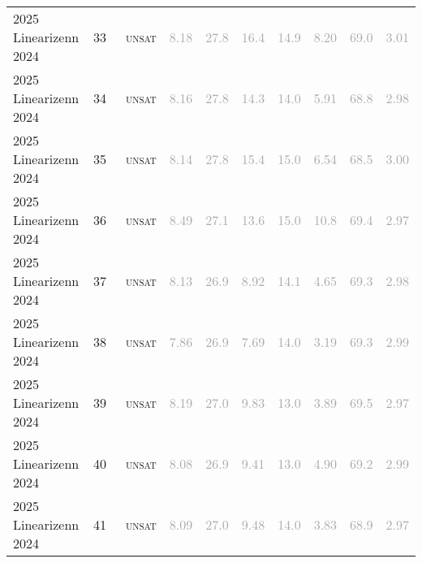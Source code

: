 \begin{center}
{\begin{longtable}{@{}llllllllll@{}}
2025 Linearizenn 2024 & 33 & ~\textsc{unsat} & \textcolor{darkgray}{8.18} & \textcolor{darkgray}{27.8} & \textcolor{darkgray}{16.4} & \textcolor{darkgray}{14.9} & \textcolor{darkgray}{8.20} & \textcolor{darkgray}{69.0} & \textcolor{darkgray}{3.01} \\
2025 Linearizenn 2024 & 34 & ~\textsc{unsat} & \textcolor{darkgray}{8.16} & \textcolor{darkgray}{27.8} & \textcolor{darkgray}{14.3} & \textcolor{darkgray}{14.0} & \textcolor{darkgray}{5.91} & \textcolor{darkgray}{68.8} & \textcolor{darkgray}{2.98} \\
2025 Linearizenn 2024 & 35 & ~\textsc{unsat} & \textcolor{darkgray}{8.14} & \textcolor{darkgray}{27.8} & \textcolor{darkgray}{15.4} & \textcolor{darkgray}{15.0} & \textcolor{darkgray}{6.54} & \textcolor{darkgray}{68.5} & \textcolor{darkgray}{3.00} \\
2025 Linearizenn 2024 & 36 & ~\textsc{unsat} & \textcolor{darkgray}{8.49} & \textcolor{darkgray}{27.1} & \textcolor{darkgray}{13.6} & \textcolor{darkgray}{15.0} & \textcolor{darkgray}{10.8} & \textcolor{darkgray}{69.4} & \textcolor{darkgray}{2.97} \\
2025 Linearizenn 2024 & 37 & ~\textsc{unsat} & \textcolor{darkgray}{8.13} & \textcolor{darkgray}{26.9} & \textcolor{darkgray}{8.92} & \textcolor{darkgray}{14.1} & \textcolor{darkgray}{4.65} & \textcolor{darkgray}{69.3} & \textcolor{darkgray}{2.98} \\
2025 Linearizenn 2024 & 38 & ~\textsc{unsat} & \textcolor{darkgray}{7.86} & \textcolor{darkgray}{26.9} & \textcolor{darkgray}{7.69} & \textcolor{darkgray}{14.0} & \textcolor{darkgray}{3.19} & \textcolor{darkgray}{69.3} & \textcolor{darkgray}{2.99} \\
2025 Linearizenn 2024 & 39 & ~\textsc{unsat} & \textcolor{darkgray}{8.19} & \textcolor{darkgray}{27.0} & \textcolor{darkgray}{9.83} & \textcolor{darkgray}{13.0} & \textcolor{darkgray}{3.89} & \textcolor{darkgray}{69.5} & \textcolor{darkgray}{2.97} \\
2025 Linearizenn 2024 & 40 & ~\textsc{unsat} & \textcolor{darkgray}{8.08} & \textcolor{darkgray}{26.9} & \textcolor{darkgray}{9.41} & \textcolor{darkgray}{13.0} & \textcolor{darkgray}{4.90} & \textcolor{darkgray}{69.2} & \textcolor{darkgray}{2.99} \\
2025 Linearizenn 2024 & 41 & ~\textsc{unsat} & \textcolor{darkgray}{8.09} & \textcolor{darkgray}{27.0} & \textcolor{darkgray}{9.48} & \textcolor{darkgray}{14.0} & \textcolor{darkgray}{3.83} & \textcolor{darkgray}{68.9} & \textcolor{darkgray}{2.97} \\

\end{longtable}}
\end{center}
